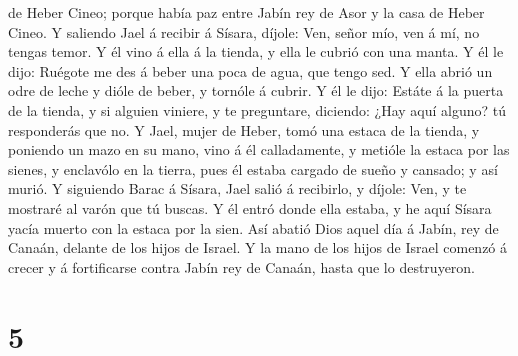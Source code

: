 de Heber Cineo; porque había paz entre Jabín rey de Asor y la casa de
Heber Cineo.  Y saliendo Jael á recibir á Sísara, díjole:
Ven, señor mío, ven á mí, no tengas temor. Y él vino á ella á la tienda,
y ella le cubrió con una manta.  Y él le dijo: Ruégote me
des á beber una poca de agua, que tengo sed. Y ella abrió un odre de
leche y dióle de beber, y tornóle á cubrir.  Y él le
dijo: Estáte á la puerta de la tienda, y si alguien viniere, y te
preguntare, diciendo: ¿Hay aquí alguno? tú responderás que no.
 Y Jael, mujer de Heber, tomó una estaca de la tienda, y
poniendo un mazo en su mano, vino á él calladamente, y metióle la estaca
por las sienes, y enclavólo en la tierra, pues él estaba cargado de
sueño y cansado; y así murió.  Y siguiendo Barac á
Sísara, Jael salió á recibirlo, y díjole: Ven, y te mostraré al varón
que tú buscas. Y él entró donde ella estaba, y he aquí Sísara yacía
muerto con la estaca por la sien.  Así abatió Dios aquel
día á Jabín, rey de Canaán, delante de los hijos de Israel.
 Y la mano de los hijos de Israel comenzó á crecer y á
fortificarse contra Jabín rey de Canaán, hasta que lo destruyeron.

\hypertarget{section-4}{%
\section{5}\label{section-4}}

